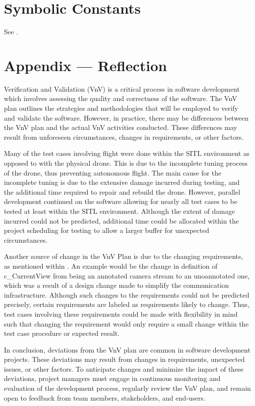 \documentclass[12pt, titlepage]{article}
\begin{document}
\section{Symbolic Constants}
See .




\newpage{}
\section*{Appendix --- Reflection}

Verification and Validation (VnV) is a critical process in software development which involves assessing the quality and correctness of the software. The VnV plan outlines the strategies and methodologies that will be employed to verify and validate the software. However, in practice, there may be differences between the VnV plan and the actual VnV activities conducted. These differences may result from unforeseen circumstances, changes in requirements, or other factors.

Many of the test cases involving flight were done within the SITL environment as opposed to with the physical drone. This is due to the incomplete tuning process of the drone, thus preventing autonomous flight. The main cause for the incomplete tuning is due to the extensive damage incurred during testing, and the additional time required to repair and rebuild the drone. However, parallel development continued on the software allowing for nearly all test cases to be tested at least within the SITL environment. Although the extent of damage incurred could not be predicted, additional time could be allocated within the project scheduling for testing to allow a larger buffer for unexpected circumstances.

Another source of change in the VnV Plan is due to the changing requirements, as mentioned within . An example would be the change in definition of c\_CurrentView from being an annotated camera stream to an unoannotated one, which was a result of a design change made to simplify the communication infrastructure. Although such changes to the requirements could not be predicted precisely, certain requirements are labeled as requirements likely to change. Thus, test cases involving these requirements could be made with flexibility in mind such that changing the requirement would only require a small change within the test case procedure or expected result.

In conclusion, deviations from the VnV plan are common in software development projects. These deviations may result from changes in requirements, unexpected issues, or other factors. To anticipate changes and minimize the impact of these deviations, project managers must engage in continuous monitoring and evaluation of the development process, regularly review the VnV plan, and remain open to feedback from team members, stakeholders, and end-users.
\end{document}
